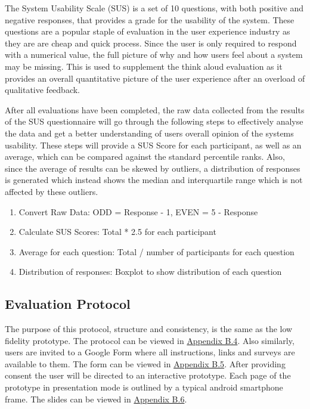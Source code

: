 \documentclass[a4 paper, 12pt]{article}
\begin{document}
    The System Usability Scale (SUS) is a set of 10 questions, with both positive and negative responses, that provides a grade for the usability of the system. These questions are a popular staple of evaluation in the user experience industry as they are are cheap and quick process. Since the user is only required to respond with a numerical value, the full picture of why and how users feel about a system may be missing. This is used to supplement the think aloud evaluation as it provides an overall quantitative picture of the user experience after an overload of qualitative feedback. 
    
    After all evaluations have been completed, the raw data collected from the results of the SUS questionnaire will go through the following steps to effectively analyse the data and get a better understanding of users overall opinion of the systems usability. These steps will provide a SUS Score for each participant, as well as an average, which can be compared against the standard percentile ranks. Also, since the average of results can be skewed by outliers, a distribution of responses is generated which instead shows the median and interquartile range which is not affected by these outliers.
        \begin{enumerate}
            \item Convert Raw Data: ODD = Response - 1, EVEN = 5 - Response
            \item Calculate SUS Scores: Total * 2.5 for each participant
            \item  Average for each question: Total / number of participants for each question
            \item Distribution of responses: Boxplot to show distribution of each question
        \end{enumerate}  

    \subsection{Evaluation Protocol}
    The purpose of this protocol, structure and consistency, is the same as the low fidelity prototype. The protocol can be viewed in \hyperref[sec:B.4]{Appendix B.4}. Also similarly, users are invited to a Google Form where all instructions, links and surveys are available to them. The form can be viewed in \hyperref[sec:B.5]{Appendix B.5}. After providing consent the user will be directed to an interactive prototype. Each page of the prototype in presentation mode is outlined by a typical android smartphone frame. The slides can be viewed in \hyperref[sec:B.1]{Appendix B.6}. 
\end{document}
